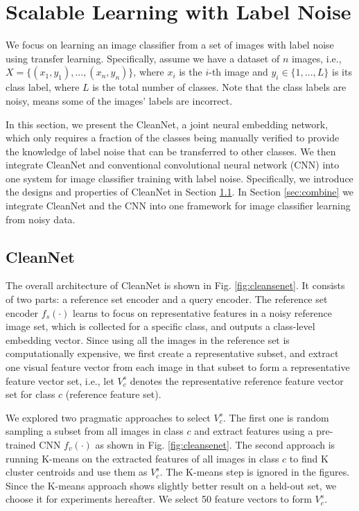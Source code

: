 \documentclass[10pt,twocolumn,letterpaper]{article}
\begin{document}
\section{Scalable Learning with Label Noise}
We focus on learning an image classifier from a set of images with label noise using transfer learning. Specifically, assume we have a dataset of $n$ images, i.e., $X = \{(x_1,y_1),...,(x_n,y_n)\}$, where $x_i$ is the $i$-th image and $y_i \in \{1,...,L\}$ is its class label, where $L$ is the total number of classes. Note that the class labels are noisy, means some of the images' labels are incorrect.

In this section, we present the CleanNet, a joint neural embedding network, which only requires a fraction of the classes being manually verified to provide the knowledge of label noise that can be transferred to other classes. We then integrate CleanNet and conventional convolutional neural network (CNN) into one system for image classifier training with label noise.  Specifically, we introduce the designs and properties of CleanNet in Section \ref{sec:denoisenet}. In Section \ref{sec:combine} we integrate CleanNet and the CNN into one framework for image classifier learning from noisy data.

\subsection{CleanNet}
\label{sec:denoisenet}
The overall architecture of CleanNet is shown in Fig. \ref{fig:cleansenet}. It consists of two parts: a reference set encoder and a query encoder. The reference set encoder $f_s(\cdot)$ learns to focus on representative features in a noisy reference image set, which is collected for a specific class, and outputs a class-level embedding vector. Since using all the images in the reference set is computationally expensive, we first create a representative subset, and extract one visual feature vector from each image in that subset to form a representative feature vector set, i.e., let $V_c^s$ denotes the representative reference feature vector set for class $c$ (reference feature set). 

We explored two pragmatic approaches to select $V_c^s$. The first one is random sampling a subset from all images in class $c$ and extract features using a pre-trained CNN $f_v(\cdot)$ as shown in Fig. \ref{fig:cleansenet}. The second approach is running K-means on the extracted features of all images in class $c$ to find K cluster centroids and use them as $V_c^s$. The K-means step is ignored in the figures. Since the K-means approach shows slightly better result on a held-out set, we choose it for experiments hereafter. We select 50 feature vectors to form $V_c^s$.
\end{document}
